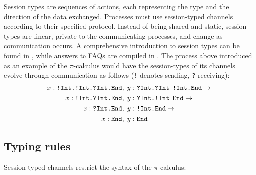 \documentclass{mproj}
\newcommand{\picalc}{$\pi$-calculus}
\newcommand{\type}{\texttt}
\newcommand{\End}{\type{End}}
\newcommand{\Send}[1]{!#1.}
\newcommand{\Recv}[1]{?#1.}
\newcommand{\reduce}{\rightarrow}
\begin{document}
Session types \cite{Honda1993, Takeuchi1994, Honda1998} are sequences of actions, each representing the type and the direction of the data exchanged.  Processes must use session-typed channels according to their specified protocol.  Instead of being shared and static, session types are linear, private to the communicating processes, and change as communication occurs. A comprehensive introduction to session types can be found in \cite{Vasconcelos2009}, while answers to FAQs are compiled in \cite{Dezani-ciancaglini2010}. The process above introduced as an example of the \picalc{} would have the session-types of its channels evolve through communication as follows (\type{!} denotes sending, \type{?} receiving):
\begin{align*}
x : \type{\Send{Int}\Send{Int}\Recv{Int}\End} &,\;
y : \type{\Recv{Int}\Recv{Int}\Send{Int}\End}
\reduce
\\
x : \type{\Send{Int}\Recv{Int}\End} &,\;
y : \type{\Recv{Int}\Send{Int}\End}
\reduce
\\
x : \type{\Recv{Int}\End} &,\;
y : \type{\Send{Int}\End}
\reduce
\\
x : \type{\End} &,\;
y : \type{\End}
\end{align*}

\subsection{Typing rules}

Session-typed channels restrict the syntax of the \picalc{}:
\end{document}
